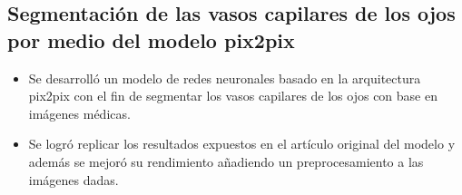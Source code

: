 \documentclass[a3paper]{adcv_color}
\begin{document}
\begin{addmargin}[0.5em]{0.5em}
	\subsection{Segmentación de las vasos capilares de los ojos por medio del modelo pix2pix}
	\begin{itemize}
		\item Se desarrolló un modelo de redes neuronales basado en la arquitectura pix2pix con el fin de segmentar los vasos capilares de los ojos con base en imágenes médicas.
		\item Se logró replicar los resultados expuestos en el artículo original del modelo y además se mejoró su rendimiento añadiendo un preprocesamiento a las imágenes dadas.
	\end{itemize}





\end{addmargin}
\end{document}
